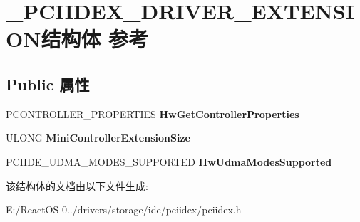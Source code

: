 \hypertarget{struct___p_c_i_i_d_e_x___d_r_i_v_e_r___e_x_t_e_n_s_i_o_n}{}\section{\+\_\+\+P\+C\+I\+I\+D\+E\+X\+\_\+\+D\+R\+I\+V\+E\+R\+\_\+\+E\+X\+T\+E\+N\+S\+I\+O\+N结构体 参考}
\label{struct___p_c_i_i_d_e_x___d_r_i_v_e_r___e_x_t_e_n_s_i_o_n}
\subsection*{Public 属性}
\begin{DoxyCompactItemize}
\item 
\mbox{\label{struct___p_c_i_i_d_e_x___d_r_i_v_e_r___e_x_t_e_n_s_i_o_n_ab22396f3ca115e99a8e1b87674855788}} 
P\+C\+O\+N\+T\+R\+O\+L\+L\+E\+R\+\_\+\+P\+R\+O\+P\+E\+R\+T\+I\+ES {\bfseries Hw\+Get\+Controller\+Properties}
\item 
\mbox{\label{struct___p_c_i_i_d_e_x___d_r_i_v_e_r___e_x_t_e_n_s_i_o_n_a24de5c88ef88b4d274843724c5e9c3bc}} 
U\+L\+O\+NG {\bfseries Mini\+Controller\+Extension\+Size}
\item 
\mbox{\label{struct___p_c_i_i_d_e_x___d_r_i_v_e_r___e_x_t_e_n_s_i_o_n_a5d59edfc618da45c8f40001cbcda7c7c}} 
P\+C\+I\+I\+D\+E\+\_\+\+U\+D\+M\+A\+\_\+\+M\+O\+D\+E\+S\+\_\+\+S\+U\+P\+P\+O\+R\+T\+ED {\bfseries Hw\+Udma\+Modes\+Supported}
\end{DoxyCompactItemize}


该结构体的文档由以下文件生成\+:\begin{DoxyCompactItemize}
\item 
E\+:/\+React\+O\+S-\/0../drivers/storage/ide/pciidex/pciidex.\+h\end{DoxyCompactItemize}
